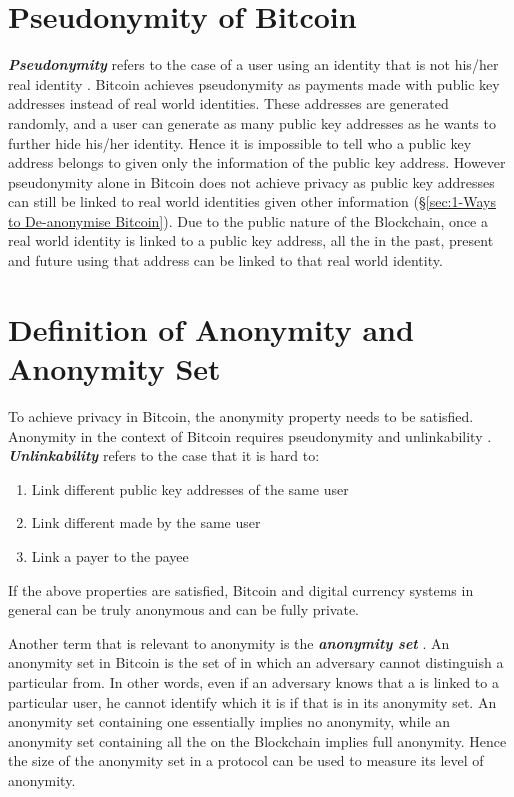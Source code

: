 \section{Pseudonymity of Bitcoin}
\label{sec:1-Pseudonymity of Bitcoin}
\textbf{\textit{Pseudonymity}} refers to the case of a user using an identity that is not his/her real identity \cite{narayanan2016bitcoin}. Bitcoin achieves pseudonymity as payments made with public key addresses instead of real world identities. These addresses are generated randomly, and a user can generate as many public key addresses as he wants to further hide his/her identity. Hence it is impossible to tell who a public key address belongs to given only the information of the public key address. However pseudonymity alone in Bitcoin does not achieve privacy as public key addresses can still be linked to real world identities given other information (\S\ref{sec:1-Ways to De-anonymise Bitcoin}). Due to the public nature of the Blockchain, once a real world identity is linked to a public key address, all the  in the past, present and future using that address can be linked to that real world identity.

\section{Definition of Anonymity and Anonymity Set}
\label{sec:1-Definition of Anonymity and Anonymity Set}
To achieve privacy in Bitcoin, the anonymity property needs to be satisfied. Anonymity in the context of Bitcoin requires pseudonymity and unlinkability \cite{narayanan2016bitcoin}. \textbf{\textit{Unlinkability}} refers to the case that it is hard to:

\begin{enumerate}
	\item Link different public key addresses of the same user
	\item Link different  made by the same user
	\item Link a payer to the payee 
\end{enumerate}

If the above properties are satisfied, Bitcoin and digital currency systems in general can be truly anonymous and  can be fully private. 

Another term that is relevant to anonymity is the \textbf{\textit{anonymity set}} \cite{narayanan2016bitcoin}. An anonymity set in Bitcoin is the set of  in which an adversary cannot distinguish a particular \kwTransaction{}{} from. In other words, even if an adversary knows that a \kwTransaction{}{} is linked to a particular user, he cannot identify which \kwTransaction{}{} it is if that \kwTransaction{}{} is in its anonymity set. An anonymity set containing one \kwTransaction{}{} essentially implies no anonymity, while an anonymity set containing all the  on the Blockchain implies full anonymity. Hence the size of the anonymity set in a protocol can be used to measure its level of anonymity.

